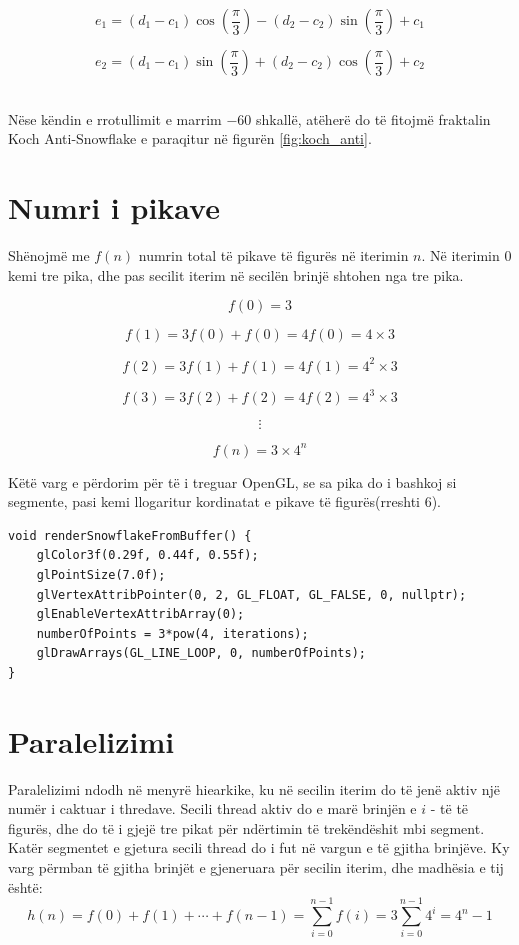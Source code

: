 \[
e_1 = (d_1 - c_1) \cos\left(\frac{\pi}{3}\right) - (d_2 - c_2) \sin\left(\frac{\pi}{3}\right) + c_1
\]

\[
e_2 = (d_1 - c_1) \sin\left(\frac{\pi}{3}\right) + (d_2 - c_2) \cos\left(\frac{\pi}{3}\right) + c_2
\]

\noindent \\ Nëse këndin e rrotullimit e marrim \(-60\) shkallë, atëherë do të fitojmë fraktalin Koch Anti-Snowflake e paraqitur në figurën \ref{fig:koch_anti}.
\section{Numri i pikave} 

Shënojmë me \( f(n) \) numrin total të pikave të figurës në iterimin  \( n \). Në iterimin 0 kemi tre pika, dhe pas secilit iterim në secilën brinjë shtohen nga tre pika.

\[
f(0) = 3
\]

\[
f(1) = 3f(0) + f(0) = 4f(0) = 4 \times 3
\]

\[
f(2) = 3f(1) + f(1) = 4f(1) = 4^2 \times 3
\]

\[
f(3) = 3f(2) + f(2) = 4f(2) = 4^3 \times 3
\]

\[
\vdots
\]

\[
f(n) = 3 \times 4^n
\]

\noindent Këtë varg e përdorim për të i treguar OpenGL, se sa pika do i bashkoj si segmente, pasi kemi llogaritur kordinatat e pikave të figurës(rreshti 6). \\

\begin{lstlisting}
void renderSnowflakeFromBuffer() {
    glColor3f(0.29f, 0.44f, 0.55f);
    glPointSize(7.0f);
    glVertexAttribPointer(0, 2, GL_FLOAT, GL_FALSE, 0, nullptr);
    glEnableVertexAttribArray(0);
    numberOfPoints = 3*pow(4, iterations);
    glDrawArrays(GL_LINE_LOOP, 0, numberOfPoints);
}
\end{lstlisting}

\section{Paralelizimi}

\noindent Paralelizimi ndodh në menyrë hiearkike, ku në secilin iterim do të jenë aktiv një numër i caktuar i thredave. Secili thread aktiv do e marë brinjën e 
\(i\) - të të figurës, dhe do të i gjejë tre pikat për ndërtimin të trekëndëshit mbi segment. Katër segmentet e gjetura secili thread do i fut në vargun e të gjitha brinjëve. Ky varg përmban të gjitha brinjët e gjeneruara për secilin iterim, dhe madhësia e tij është:
\[
h(n) = f(0) + f(1) + \cdots + f(n-1) = \sum_{i=0}^{n-1} f(i) = 3 \sum_{i=0}^{n-1} 4^i = 4^n - 1
\]

